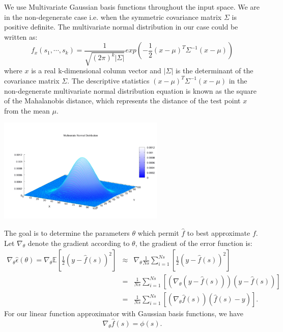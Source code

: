 \documentclass[pdftex,a4paper,11pt]{report}
\begin{document}
We use Multivariate Gaussian basis functions throughout the input space. We are in the non-degenerate case i.e. when the symmetric covariance matrix $\Sigma$ is positive definite. The multivariate normal distribution in our case could be written as:
\begin{equation}
	f_x(s_1, \cdots, s_k) = \frac{1}{\sqrt{(2\pi)^k|\Sigma|}}exp\left(-\frac{1}{2}(x - \mu)^T\Sigma^{-1}(x - \mu)\right)
\end{equation}
where $x$ is a real k-dimensional column vector and $|\Sigma|$ is the determinant of the covariance matrix $\Sigma$.
The descriptive statistics $(x - \mu)^T\Sigma^{-1}(x - \mu)$ in the non-degenerate multivariate normal distribution equation is known as the square of the Mahalanobis distance, which represents the distance of the test point $x$ from the mean $\mu$.
\begin{center}
	\includegraphics[scale=1]{images/Multivariate_Gaussian.png}
\end{center}
The goal is to determine the parameters $\mathbb{\theta}$ which permit $\hat{f}$ to best approximate $f$.
Let $\nabla_\theta$ denote the gradient according to $\theta$, the gradient of the error function is:
\begin{eqnarray}
\nabla_\theta\hat{\epsilon}(\theta) = \nabla_\theta\mathbb{E}\left[\frac{1}{2}(y - \hat{f}(s))^2\right] & \approx & \nabla_\theta\frac{1}{Ns}\sum\limits_{i=1}^{Ns}\left[\frac{1}{2}(y - \hat{f}(s))^2\right] \nonumber \\
 & = & \frac{1}{Ns}\sum\limits_{i=1}^{Ns}\left[(\nabla_\theta(y - \hat{f}(s)))(y - \hat{f}(s))\right] \nonumber \\
 & = & \frac{1}{Ns}\sum\limits_{i=1}^{Ns}\left[(\nabla_\theta\hat{f}(s))(\hat{f}(s) - y)\right].
\end{eqnarray}
For our linear function approximator with Gaussian basis functions, we have
\begin{equation}
\nabla_\theta\hat{f}(s) = \phi(s).
\end{equation}
\end{document}
